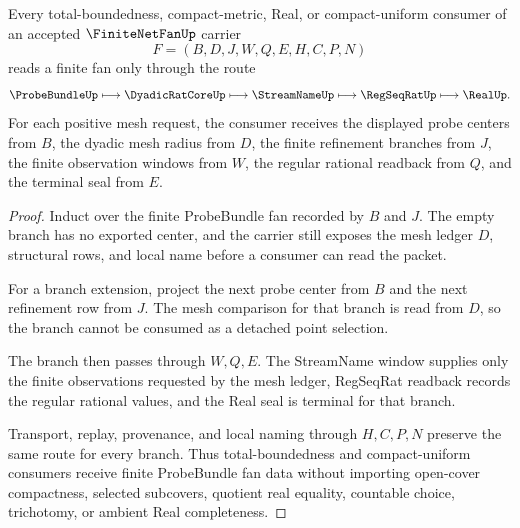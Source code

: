 \begin{theorem}
\label{thm:finite-net-fan-probebundle-handoff}
Every total-boundedness, compact-metric, Real, or compact-uniform consumer of an accepted $\FiniteNetFanUp$ carrier
$$
F=(B,D,J,W,Q,E,H,C,P,N)
$$
reads a finite fan only through the route
$$
\ProbeBundleUp \longmapsto \DyadicRatCoreUp \longmapsto \StreamNameUp \longmapsto \RegSeqRatUp \longmapsto \RealUp .
$$
For each positive mesh request, the consumer receives the displayed probe centers from $B$, the dyadic mesh radius from $D$, the finite refinement branches from $J$, the finite observation windows from $W$, the regular rational readback from $Q$, and the terminal seal from $E$.
\end{theorem}
\begin{proof}
Induct over the finite ProbeBundle fan recorded by $B$ and $J$. The empty branch has no exported center, and the carrier still exposes the mesh ledger $D$, structural rows, and local name before a consumer can read the packet.

For a branch extension, project the next probe center from $B$ and the next refinement row from $J$. The mesh comparison for that branch is read from $D$, so the branch cannot be consumed as a detached point selection.

The branch then passes through $W,Q,E$. The StreamName window supplies only the finite observations requested by the mesh ledger, RegSeqRat readback records the regular rational values, and the Real seal is terminal for that branch.

Transport, replay, provenance, and local naming through $H,C,P,N$ preserve the same route for every branch. Thus total-boundedness and compact-uniform consumers receive finite ProbeBundle fan data without importing open-cover compactness, selected subcovers, quotient real equality, countable choice, trichotomy, or ambient Real completeness.
\end{proof}


